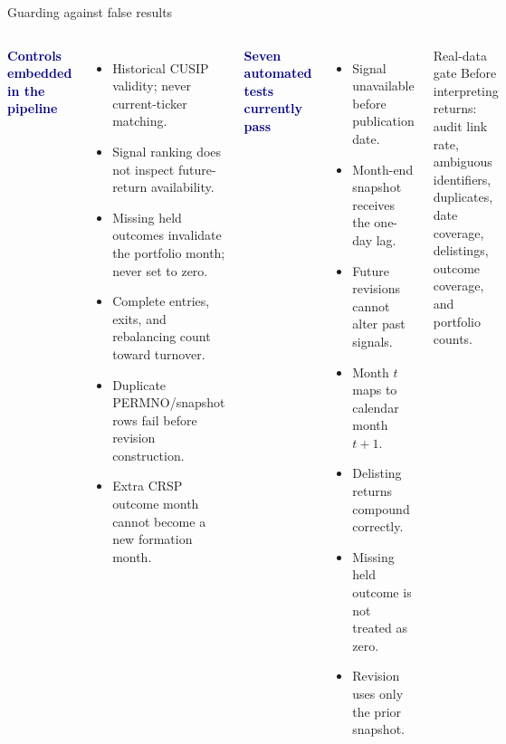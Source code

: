 \documentclass[aspectratio=169,10pt]{beamer}
\newcommand{\smallhead}[1]{\textcolor{navy}{\textbf{#1}}}
\begin{document}
\begin{frame}[shrink=9]{Guarding against false results}
\begin{columns}[T,onlytextwidth]
\smallhead{Controls embedded in the pipeline}
\begin{itemize}\setlength\itemsep{0.30em}
  \item Historical CUSIP validity; never current-ticker matching.
  \item Signal ranking does not inspect future-return availability.
  \item Missing held outcomes invalidate the portfolio month; never set to zero.
  \item Complete entries, exits, and rebalancing count toward turnover.
  \item Duplicate PERMNO/snapshot rows fail before revision construction.
  \item Extra CRSP outcome month cannot become a new formation month.
\end{itemize}
\smallhead{Seven automated tests currently pass}
\begin{itemize}\setlength\itemsep{0.30em}
  \item Signal unavailable before publication date.
  \item Month-end snapshot receives the one-day lag.
  \item Future revisions cannot alter past signals.
  \item Month $t$ maps to calendar month $t+1$.
  \item Delisting returns compound correctly.
  \item Missing held outcome is not treated as zero.
  \item Revision uses only the prior snapshot.
\end{itemize}
\begin{alertblock}{Real-data gate}
Before interpreting returns: audit link rate, ambiguous identifiers, duplicates, date coverage, delistings, outcome coverage, and portfolio counts.
\end{alertblock}
\end{columns}
\end{frame}
\end{document}
